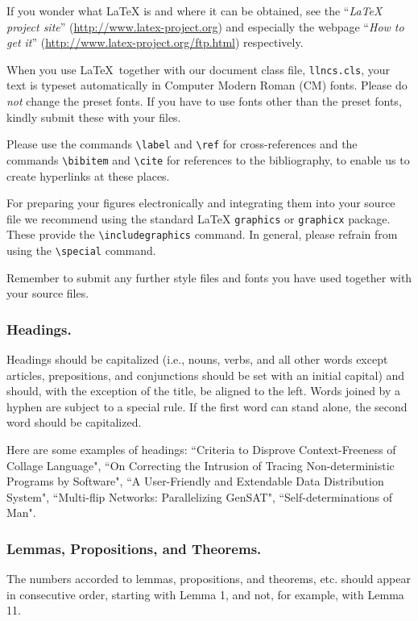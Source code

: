 \documentclass{book}
\begin{document}
If you wonder what \LaTeX{} is and where it can be obtained, see the
``\textit{LaTeX project site}'' (\url{http://www.latex-project.org})
and especially the webpage ``\textit{How to get it}''
(\url{http://www.latex-project.org/ftp.html}) respectively.

When you use \LaTeX\ together with our document class file,
\texttt{llncs.cls},
your text is typeset automatically in Computer Modern Roman (CM) fonts.
Please do
\emph{not} change the preset fonts. If you have to use fonts other
than the preset fonts, kindly submit these with your files.

Please use the commands \verb+\label+ and \verb+\ref+ for
cross-references and the commands \verb+\bibitem+ and \verb+\cite+ for
references to the bibliography, to enable us to create hyperlinks at
these places.

For preparing your figures electronically and integrating them into
your source file we recommend using the standard \LaTeX{} \verb+graphics+ or
\verb+graphicx+ package. These provide the \verb+\includegraphics+ command.
In general, please refrain from using the \verb+\special+ command.

Remember to submit any further style files and
fonts you have used together with your source files.

\subsubsection{Headings.}

Headings should be capitalized
(i.e., nouns, verbs, and all other words
except articles, prepositions, and conjunctions should be set with an
initial capital) and should,
with the exception of the title, be aligned to the left.
Words joined by a hyphen are subject to a special rule. If the first
word can stand alone, the second word should be capitalized.

Here are some examples of headings: ``Criteria to Disprove
Context-Freeness of Collage Language", ``On Correcting the Intrusion of
Tracing Non-deterministic Programs by Software", ``A User-Friendly and
Extendable Data Distribution System", ``Multi-flip Networks:
Parallelizing GenSAT", ``Self-determinations of Man".

\subsubsection{Lemmas, Propositions, and Theorems.}

The numbers accorded to lemmas, propositions, and theorems, etc. should
appear in consecutive order, starting with Lemma 1, and not, for
example, with Lemma 11.
\end{document}
